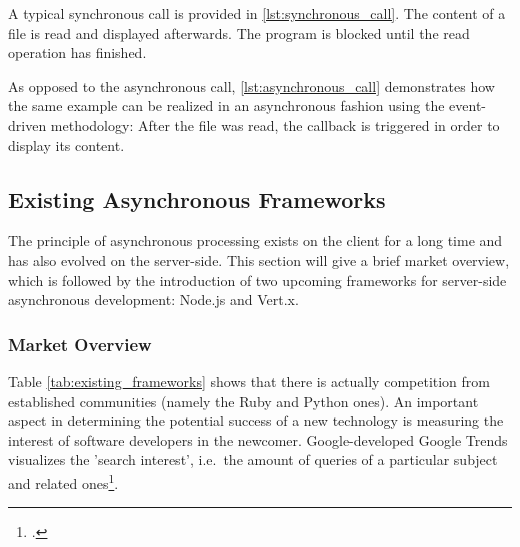 
A typical synchronous call is provided in \autoref{lst:synchronous_call}. The
content of a file is read and displayed afterwards. The program is blocked until the
read operation has finished.



As opposed to the asynchronous call, \autoref{lst:asynchronous_call} demonstrates
how the same example can be realized in an asynchronous fashion using the event-driven
methodology: After the file was read, the callback is triggered in order to
display its content.






\subsection{Existing Asynchronous Frameworks}
\label{existing_frameworks}
The principle of asynchronous processing exists on the client for a long time and has also evolved
on the server-side. This section will give a brief market overview, which is followed by the
introduction of two upcoming frameworks for server-side asynchronous
development: Node.js and Vert.x.


\subsubsection{Market Overview}
\label{frameworks_overview}
\FloatBarrier
Table \ref{tab:existing_frameworks} shows that there is actually competition
from established communities (namely the Ruby and Python ones). An important
aspect in determining the potential success of a new technology is measuring the
interest of software developers in the newcomer. Google-developed Google Trends
visualizes the 'search interest', i.e.\ the amount of queries of a particular
subject and related ones\footcite[Cf.][]{g_trends}.

